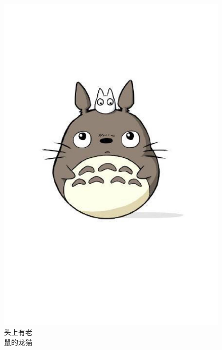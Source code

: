 \documentclass[12pt]{ctexart}
\begin{document}
\begin{spacing}{1.5}
\begin{figure}[h]
\begin{minipage}[t]{0.3\linewidth}
		\includegraphics[width=1\textwidth]{figures/2.jpg}
		\caption*{\protect 头上有老\\鼠的龙猫}
	\end{minipage}
	\hfill
	\begin{minipage}[t]{0.3\linewidth}

\end{minipage}
\end{figure}
\end{spacing}
\end{document}
